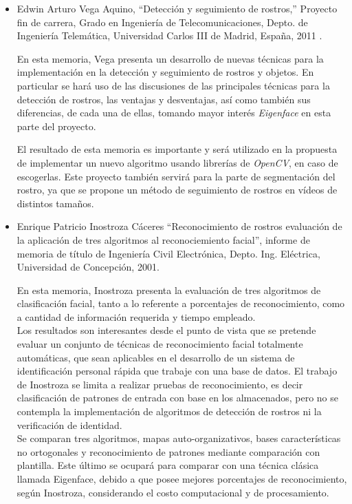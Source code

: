 \documentclass[letterpaper,12pt]{article}
\begin{document}
\begin{itemize}
\item Edwin Arturo Vega Aquino,
``Detección y seguimiento de rostros,''
Proyecto fin de carrera, Grado en Ingeniería de Telecomunicaciones, Depto. de Ingeniería Telemática, Universidad Carlos III de Madrid,
España, 2011 \cite{UCarlosIII}.

En esta memoria, Vega presenta un desarrollo de nuevas técnicas para la implementación en la detección y seguimiento de rostros y objetos. En particular se hará uso de las discusiones de las principales técnicas para la detección de rostros, las ventajas y desventajas, así como también sus diferencias, de cada una de ellas, tomando mayor interés \textit{Eigenface} en esta parte del proyecto.

El resultado de esta memoria es importante y  será utilizado en la propuesta de implementar un nuevo algoritmo usando librerías de \textit{OpenCV}, en caso de escogerlas. Este proyecto también servirá para la parte de segmentación del rostro, ya que se propone un método de seguimiento de rostros en vídeos de distintos tamaños.

\item Enrique Patricio Inostroza Cáceres
``Reconocimiento de rostros evaluación de la aplicación de tres algoritmos al reconociemiento facial'', informe de memoria de título de Ingeniería Civil Electrónica, Depto. Ing. Eléctrica, Universidad de Concepción, 2001. \cite{ElectronicoUdeC}

En esta memoria, Inostroza presenta la evaluación de tres algoritmos de clasificación facial, tanto a lo referente a porcentajes de reconocimiento, como a cantidad de información requerida y tiempo empleado.\\
Los resultados son interesantes desde el punto de vista que se pretende evaluar un conjunto de técnicas de reconocimiento facial totalmente automáticas, que sean aplicables en el desarrollo de un sistema de identificación personal rápida que trabaje con una base de datos. El trabajo de Inostroza se limita a realizar pruebas de reconocimiento, es decir clasificación de patrones de entrada con base en los almacenados, pero no se contempla la implementación de algoritmos de detección de rostros ni la verificación de identidad.\\

 Se comparan tres algoritmos, mapas auto-organizativos, bases características no ortogonales y reconocimiento de patrones mediante comparación con plantilla. Este último se ocupará para comparar con una técnica clásica llamada Eigenface, debido a que posee mejores porcentajes de reconocimiento, según Inostroza, considerando el costo computacional y de procesamiento. 




\end{itemize}
\end{document}
